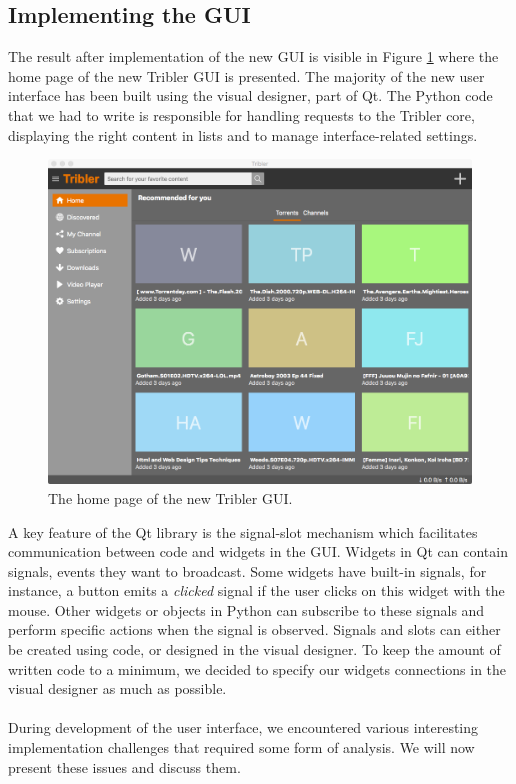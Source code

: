\subsection{Implementing the GUI}
The result after implementation of the new GUI is visible in Figure \ref{fig:new-gui-1} where the home page of the new Tribler GUI is presented. The majority of the new user interface has been built using the visual designer, part of Qt. The Python code that we had to write is responsible for handling requests to the Tribler core, displaying the right content in lists and to manage interface-related settings.\\

\begin{figure}[t]
	\centering
	\includegraphics[width=1.0\columnwidth]{images/improving_qa/newgui1}
	\caption{The home page of the new Tribler GUI.}
	\label{fig:new-gui-1}
\end{figure}

A key feature of the Qt library is the signal-slot mechanism which facilitates communication between code and widgets in the GUI. Widgets in Qt can contain signals, events they want to broadcast. Some widgets have built-in signals, for instance, a button emits a \emph{clicked} signal if the user clicks on this widget with the mouse. Other widgets or objects in Python can subscribe to these signals and perform specific actions when the signal is observed. Signals and slots can either be created using code, or designed in the visual designer. To keep the amount of written code to a minimum, we decided to specify our widgets connections in the visual designer as much as possible.\\\\
During development of the user interface, we encountered various interesting implementation challenges that required some form of analysis. We will now present these issues and discuss them.

